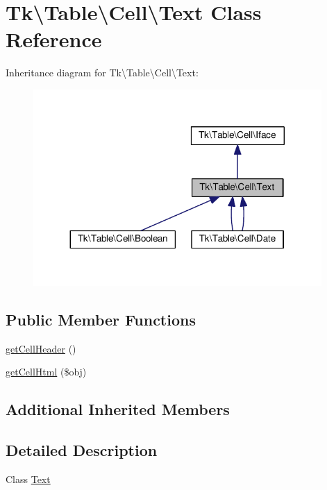 \hypertarget{classTk_1_1Table_1_1Cell_1_1Text}{\section{Tk\textbackslash{}Table\textbackslash{}Cell\textbackslash{}Text Class Reference}
\label{classTk_1_1Table_1_1Cell_1_1Text}
}


Inheritance diagram for Tk\textbackslash{}Table\textbackslash{}Cell\textbackslash{}Text\+:\nopagebreak
\begin{figure}[H]
\begin{center}
\leavevmode
\includegraphics[width=311pt]{classTk_1_1Table_1_1Cell_1_1Text__inherit__graph}
\end{center}
\end{figure}
\subsection*{Public Member Functions}
\begin{DoxyCompactItemize}
\item 
\hyperlink{classTk_1_1Table_1_1Cell_1_1Text_a5b469deffdfc0cf98cd62a7018bd2c3c}{get\+Cell\+Header} ()
\item 
\hyperlink{classTk_1_1Table_1_1Cell_1_1Text_acb36a0652b5f90671b75935b1cc79523}{get\+Cell\+Html} (\$obj)
\end{DoxyCompactItemize}
\subsection*{Additional Inherited Members}


\subsection{Detailed Description}
Class \hyperlink{classTk_1_1Table_1_1Cell_1_1Text}{Text}

